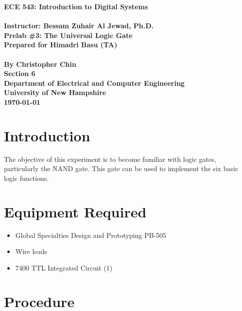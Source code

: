 \documentclass[11pt,a4paper]{article}
\begin{document}
\begin{center}
\textbf{
    \Large{ECE 543: Introduction to Digital Systems}
    \\~\\
    \large{Instructor: Bessam Zuhair Al Jewad, Ph.D.}
    \\[1.25in]
    \LARGE{Prelab \#3: The Universal Logic Gate}
    \\[0.62in]
    \large{Prepared for Himadri Basu (TA)\\~\\By Christopher Chin}
    \\[1.25in]
    \LARGE{Section 6}
    \\[1.25in]
    \Large{Department of Electrical and Computer Engineering\\
           University of New Hampshire}
    \\[1.25in]
    \Large{\today}
}
\end{center}
\clearpage
{}

\tableofcontents
\pagebreak

\section{Introduction}
The objective of this experiment is to become familiar with logic gates, particularly
the NAND gate. This gate can be used to implement the six basic logic functions.

\section{Equipment Required}
\begin{itemize}
    \item Global Specialties Design and Prototyping PB-505
    \item Wire leads
    \item 7400 TTL Integrated Circuit (1)
\end{itemize}

\section{Procedure}
\end{document}
